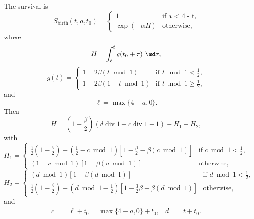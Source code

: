 \documentclass{jpmarticle}
\DeclareMathOperator{\dv}{div}
\begin{document}
The survival is
\begin{equation}
  S_{\mathrm{birth}}(t, a, t_0) =
  \begin{cases}
    1 & \text{if a < 4 - t},
    \\
    \exp(-\alpha H) & \text{otherwise},
  \end{cases}
\end{equation}
where
\begin{equation}
  H =
  \int_{\ell}^t g(t_0 + \tau)~\md \tau,
\end{equation}
\begin{equation}
  g (t) =
  \begin{cases}
    1 - 2 \beta (t \bmod 1)
    & \text{if $t \bmod 1 < \frac{1}{2}$},
    \\
    1 - 2 \beta (1 - t \bmod 1)
    & \text{if $t \bmod 1 \geq \frac{1}{2}$},
  \end{cases}
\end{equation}
and
\begin{equation}
  \ell = \max\{4 - a, 0\}.
\end{equation}
Then
\begin{equation}
  H =
  \left(1 - \frac{\beta}{2}\right)
  \left(d \dv 1 - c \dv 1 - 1\right)
  + H_1  + H_2,
\end{equation}
with
\begin{equation}
  H_1 =
  \begin{cases}
    \frac{1}{2} \left(1 - \frac{\beta}{2}\right)
    + \left(\frac{1}{2} - c \bmod 1\right)
    \left[1 - \frac{\beta}{2} - \beta \left(c \bmod 1\right)\right]
    & \text{if $c \bmod 1 < \frac{1}{2}$},
    \\
    \left(1 - c \bmod 1\right)
    \left[ 1 - \beta \left(c \bmod 1\right)\right]
    & \text{otherwise},
  \end{cases}
\end{equation}
\begin{equation}
  H_2 =
  \begin{cases}
    \left(d \bmod 1\right)\left[1 - \beta \left(d \bmod 1\right)\right]
    & \text{if $d \bmod 1 < \frac{1}{2}$},
    \\
    \frac{1}{2} \left(1 - \frac{\beta}{2}\right)
    + \left(d \bmod 1 - \frac{1}{2}\right)
    \left[1 - \frac{3}{2} \beta + \beta \left(d \bmod 1\right)\right]
    & \text{otherwise},
    \end{cases}
\end{equation}
and
\begin{align}
  c &= \ell + t_0 = \max\{4 - a, 0\} + t_0,
  &
  d &= t + t_0.
\end{align}
\end{document}
